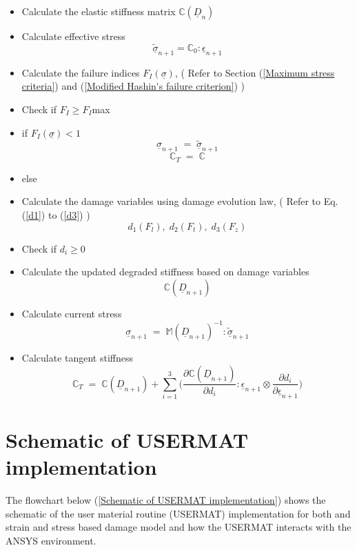 \documentclass[12pt,a4paper,twoside,openright]{report}
\begin{document}
\begin{itemize}
\item Calculate the elastic stiffness matrix  \textbf{$\mathbb{C}(\underline{D}_{n})$}
\item Calculate effective stress \textbf{$$\underline{\tilde{\sigma}}_{n+1} = \mathbb{C}_{0} : \underline{\epsilon}_{n+1} $$}
\item Calculate the failure indices \textbf{$F_{I}(\underline{\sigma})$},\;\; ( Refer to Section (\ref{Maximum stress criteria}) and (\ref{Modified Hashin's failure criterion}) )
\item[] Check if $F_{I} \geq F_{I}$max
\item if \textbf{$F_{I}(\underline{\sigma})<1$} \textbf{$$\underline{\sigma}_{n+1} \; = \; \underline{\tilde{\sigma}}_{n+1} $$} \textbf{$$\mathbb{C}_{T} \; = \; \mathbb{C}$$}
\item else
   	
\item[]  Calculate the damage variables using damage evolution law, \;\; ( Refer to Eq. (\ref{d1}) to (\ref{d3}) )  \textbf{$$d_{1}(F_{l}),\;d_{2}(F_{t}),\;d_{3}(F_{z})$$}  	
\item[]  Check if $d_{i} \geq 0 $ 
\item[]  Calculate the updated degraded stiffness based on damage variables \textbf{$$\mathbb{C}(\underline{D}_{n+1})$$}
\item[]  Calculate current stress  \textbf{$$\underline{\sigma}_{n+1} \; = \;  \mathbb{M}(\underline{D}_{n+1})^{-1}:\underline{\tilde{\sigma}}_{n+1} $$}
\item[] Calculate tangent stiffness \textbf{$$\mathbb{C}_{T}  \; = \;\mathbb{C}(\underline{D}_{n+1}) + \sum_{i = 1}^{3} \Big( \frac{\partial \mathbb{C}(\underline{D}_{n+1}) }{\partial d_{i}} : \underline{\epsilon}_{n+1} \otimes \frac{\partial d_{i}}{\partial \underline{\epsilon}_{n+1} }\Big)$$}
	
\end{itemize} 

\newpage
\section{Schematic of USERMAT implementation}
\indent\indent\indent The flowchart below (\ref{Schematic of USERMAT implementation}) shows the schematic of the user material routine (USERMAT) implementation for both and strain and stress based damage model and how the USERMAT interacts with the ANSYS environment.\\
\end{document}
